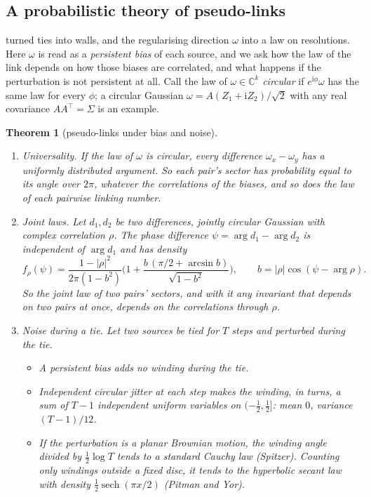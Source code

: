 \documentclass[11pt]{article}
\newtheorem{theorem}{Theorem}\newtheorem{proposition}[theorem]{Proposition}\newtheorem{lemma}[theorem]{Lemma}\newtheorem{corollary}[theorem]{Corollary}\newtheorem{conjecture}[theorem]{Conjecture}\crefname{conjecture}{Conjecture}{Conjectures}
\theoremstyle{definition}\newtheorem{definition}[theorem]{Definition}\newtheorem{remark}[theorem]{Remark}\newtheorem{example}[theorem]{Example}\newtheorem{problem}[theorem]{Open problem}\crefname{problem}{Problem}{Problems}
\begin{document}
\subsection{A probabilistic theory of pseudo-links}\label{sec:pseudoprob}
 turned ties into walls, and the regularising direction $\omega$ into a law on resolutions. Here $\omega$ is read as a \emph{persistent bias} of each source, and we ask how the law of the link depends on how those biases are correlated, and what happens if the perturbation is not persistent at all. Call the law of $\omega\in\mathbb C^k$ \emph{circular} if $e^{\mathrm i\phi}\omega$ has the same law for every $\phi$; a circular Gaussian $\omega=A(Z_1+\mathrm iZ_2)/\sqrt2$ with any real covariance $AA^\top=\Sigma$ is an example.

\begin{theorem}[pseudo-links under bias and noise]\label{thm:pseudoprob}
\begin{enumerate}
\item[(i)] \emph{Universality.} If the law of $\omega$ is circular, every difference $\omega_x-\omega_y$ has a uniformly distributed argument. So each pair's sector has probability equal to its angle over $2\pi$, whatever the correlations of the biases, and so does the law of each pairwise linking number.
\item[(ii)] \emph{Joint laws.} Let $d_1,d_2$ be two differences, jointly circular Gaussian with complex correlation $\rho$. The phase difference $\psi=\arg d_1-\arg d_2$ is independent of $\arg d_1$ and has density
\[
f_\rho(\psi)=\frac{1-|\rho|^2}{2\pi(1-b^2)}\Big(1+\frac{b\,(\pi/2+\arcsin b)}{\sqrt{1-b^2}}\Big),\qquad b=|\rho|\cos(\psi-\arg\rho).
\]
So the joint law of two pairs' sectors, and with it any invariant that depends on two pairs at once, depends on the correlations through $\rho$.
\item[(iii)] \emph{Noise during a tie.} Let two sources be tied for $T$ steps and perturbed during the tie.
\begin{itemize}
\item A persistent bias adds no winding during the tie.
\item Independent circular jitter at each step makes the winding, in turns, a sum of $T-1$ independent uniform variables on $(-\tfrac12,\tfrac12]$: mean $0$, variance $(T-1)/12$.
\item If the perturbation is a planar Brownian motion, the winding angle divided by $\tfrac12\log T$ tends to a standard Cauchy law (Spitzer). Counting only windings outside a fixed disc, it tends to the hyperbolic secant law with density $\tfrac12\operatorname{sech}(\pi x/2)$ (Pitman and Yor).
\end{itemize}
\end{enumerate}
\end{theorem}
\end{document}
